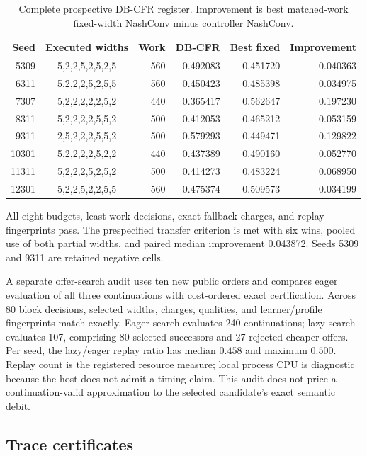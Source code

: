 \begin{table}[h]
\caption{Complete prospective DB-CFR register.  Improvement is best
matched-work fixed-width NashConv minus controller NashConv.}
\label{tab:app-prospective-controller}
\centering\footnotesize
\setlength{\tabcolsep}{3pt}
\begin{tabular}{@{}rcrrrr@{}}
\toprule
Seed & Executed widths & Work & DB-CFR & Best fixed & Improvement \\
\midrule
5309  & 5,2,2,5,2,5,2,5 & 560 & 0.492083 & 0.451720 & -0.040363 \\
6311  & 5,2,2,2,5,2,5,5 & 560 & 0.450423 & 0.485398 &  0.034975 \\
7307  & 5,2,2,2,2,2,5,2 & 440 & 0.365417 & 0.562647 &  0.197230 \\
8311  & 5,2,2,2,2,5,5,2 & 500 & 0.412053 & 0.465212 &  0.053159 \\
9311  & 2,5,2,2,2,5,5,2 & 500 & 0.579293 & 0.449471 & -0.129822 \\
10301 & 5,2,2,2,2,5,2,2 & 440 & 0.437389 & 0.490160 &  0.052770 \\
11311 & 5,2,2,2,5,2,5,2 & 500 & 0.414273 & 0.483224 &  0.068950 \\
12301 & 5,2,2,5,2,2,5,5 & 560 & 0.475374 & 0.509573 &  0.034199 \\
\bottomrule
\end{tabular}
\end{table}

All eight budgets, least-work decisions, exact-fallback charges, and replay
fingerprints pass.  The prespecified transfer criterion is met with six wins,
pooled use
of both partial widths, and paired median improvement 0.043872.  Seeds 5309
and 9311 are retained negative cells.

A separate offer-search audit uses ten new public orders and compares eager
evaluation of all three continuations with cost-ordered exact certification.
Across 80 block decisions, selected widths, charges, qualities, and
learner/profile fingerprints match exactly.  Eager search evaluates 240
continuations; lazy search evaluates 107, comprising 80 selected successors
and 27 rejected cheaper offers.  Per seed, the lazy/eager replay ratio has
median $0.458$ and maximum $0.500$.  Replay count is the registered resource
measure; local process CPU is diagnostic because the host does not admit a
timing claim.  This audit does not price a continuation-valid approximation
to the selected candidate's exact semantic debit.

\subsection{Trace certificates}
\label{app:certificate-instantiation}


